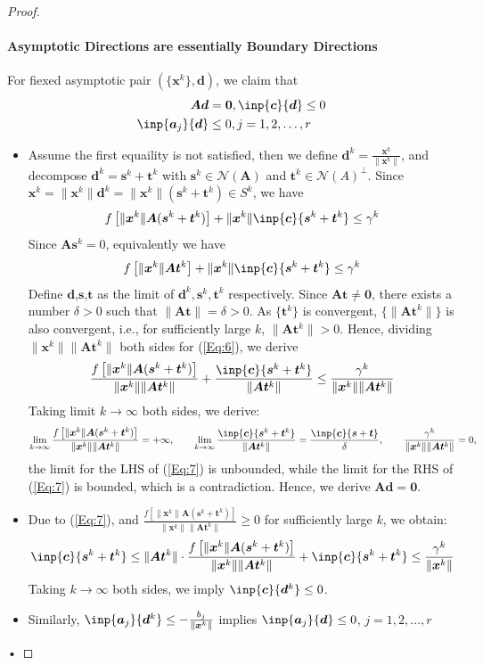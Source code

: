 \begin{enumerate}
\begin{proof}
\paragraph{Asymptotic Directions are essentially Boundary Directions} For fiexed asymptotic pair $(\{\bm x^k\},\bm d)$, we claim that 
\begin{align}
\bm A\bm d&=\bm0,\inp{\bm c}{\bm d}\le0\\
\inp{\bm a_j}{\bm d}&\le0, j=1,2,\dots,r
\end{align}
\begin{itemize}
\item
Assume the first equaility is not satisfied, then we define $\bm d^k=\frac{\bm x^k}{\|\bm x^k\|}$, and decompose $\bm d^k=\bm s^k+\bm t^k$ with $\bm s^k\in\mathcal{N}(\bm A)$ and $\bm t^k\in\mathcal{N}(A)^\perp$. Since $\bm x^k=\|\bm x^k\|\bm d^k=\|\bm x^k\|(\bm s^k+\bm t^k)\in S^k$, we have
\begin{equation*}
f\left[\|\bm x^k\|\bm A(\bm s^k+\bm t^k)\right]+\|\bm x^k\|\inp{\bm c}{\bm s^k+\bm t^k}\le\gamma^k
\end{equation*}
Since $\bm A\bm s^k=0$, equivalently we have
\begin{equation}
f\left[\|\bm x^k\|\bm A\bm t^k\right]+\|\bm x^k\|\inp{\bm c}{\bm s^k+\bm t^k}\le\gamma^k\label{Eq:6}
\end{equation}
Define $\bm d$,$\bm s$,$\bm t$ as the limit of $\bm d^k,\bm s^k,\bm t^k$ respectively. Since $\bm{At}\ne\bm0$, there exists a number $\delta>0$ such that $\|\bm{At}\|=\delta>0$. As $\{\bm t^k\}$ is convergent, $\{\|\bm{At}^k\|\}$ is also convergent, i.e., for sufficiently large $k$, $\|\bm A\bm t^k\|>0$. Hence, dividing $\|\bm x^k\|\|\bm A\bm t^k\|$ both sides for (\ref{Eq:6}), we derive
\begin{equation}
\frac{f\left[\|\bm x^k\|\bm A(\bm s^k+\bm t^k)\right]}{\|\bm x^k\|\|\bm A\bm t^k\|}+\frac{\inp{\bm c}{\bm s^k+\bm t^k}}{\|\bm A\bm t^k\|}\le\frac{\gamma^k}{\|\bm x^k\|\|\bm A\bm t^k\|}\label{Eq:7}
\end{equation}
Taking limit $k\to\infty$ both sides, we derive:
\[
\lim_{k\to\infty}\frac{f\left[\|\bm x^k\|\bm A(\bm s^k+\bm t^k)\right]}{\|\bm x^k\|\|\bm A\bm t^k\|}=+\infty,
\qquad
\lim_{k\to\infty}\frac{\inp{\bm c}{\bm s^k+\bm t^k}}{\|\bm A\bm t^k\|}=\frac{\inp{\bm c}{\bm s+\bm t}}{\delta},
\qquad
\frac{\gamma^k}{\|\bm x^k\|\|\bm A\bm t^k\|}=0,
\]
the limit for the LHS of (\ref{Eq:7}) is unbounded, while the limit for the RHS of (\ref{Eq:7}) is bounded, which is a contradiction. Hence, we derive $\bm{Ad}=\bm0$.
\item
Due to (\ref{Eq:7}), and $\frac{f\left[\|\bm x^k\|\bm A(\bm s^k+\bm t^k)\right]}{\|\bm x^k\|\|\bm A\bm t^k\|}\ge0$ for sufficiently large $k$, we obtain:
\[
\inp{\bm c}{\bm s^k+\bm t^k}\le\|\bm A\bm t^k\|\cdot\frac{f\left[\|\bm x^k\|\bm A(\bm s^k+\bm t^k)\right]}{\|\bm x^k\|\|\bm A\bm t^k\|}+\inp{\bm c}{\bm s^k+\bm t^k}\le\frac{\gamma^k}{\|\bm x^k\|}
\]
Taking $k\to\infty$ both sides, we imply $\inp{\bm c}{\bm d^k}\le0$.
\item
Similarly, $\inp{\bm a_j}{\bm d^k}\le-\frac{b_j}{\|\bm x^k\|}$ implies $\inp{\bm a_j}{\bm d}\le0$, $j=1,2,\dots,r$
\end{itemize}•


\end{proof}
\end{enumerate}
